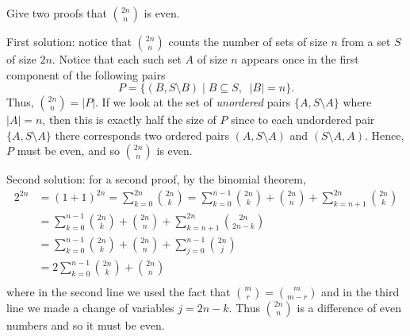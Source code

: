 \documentclass[11pt,dvipsnames]{book}
\numberwithin{figure}{section} %
\numberwithin{table}{section} %
\begin{document}
 \begin{exercise}
  Give two proofs that ${2n\choose n}$ is even.
  \begin{solution}
  First solution: notice that ${2n\choose n}$ counts the number of sets of size $n$ from a set $S$ of size $2n$. Notice that each such set $A$ of size $n$ appears once in the first component of the following pairs
 \[P=\{(B,S\setminus B) \; | \; B\subseteq S,\;\; |B|=n\}.\]
Thus, ${2n\choose n}=|P|$. If we look at the set of {\it unordered} pairs $\{A,S\setminus A\}$ where $|A|=n$, then this is exactly half the size of $P$ since to each undordered pair $\{A,S\setminus A\}$ there corresponds two ordered pairs $(A,S\setminus A)$ and $(S\setminus A,A)$. Hence, $P$ must be even, and so ${2n \choose n}$ is even. \\
\end{solution}

\begin{solution}
Second solution: for a second proof, by the binomial theorem,
\begin{align*}
2^{2n} & = (1+1)^{2n} = \sum_{k=0}^{2n} {2n\choose k}
=\sum_{k=0}^{n-1} {2n\choose k}+{2n\choose n}+\sum_{k=n+1}^{2n} {2n\choose k}\\
& =\sum_{k=0}^{n-1} {2n\choose k}+{2n\choose n}+\sum_{k=n+1}^{2n} {2n\choose 2n-k}\\
& =\sum_{k=0}^{n-1} {2n\choose k}+{2n\choose n}+\sum_{j=0}^{n-1} {2n\choose j}\\
& = 2 \sum_{k=0}^{n-1} {2n\choose k}+{2n\choose n}\\
\end{align*}
where in the second line we used the fact that ${m \choose r} = {m \choose m-r}$ and in the third line we made a change of variables $j = 2n-k$. Thus ${2n\choose n}$ is a difference of even numbers and so it must be even.
\end{solution}
\end{exercise}
\end{document}
